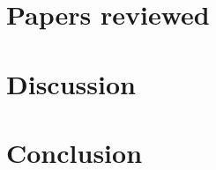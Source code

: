 \section{Papers reviewed}





\section{Discussion}\label{sec:discussion}


\section{Conclusion}









